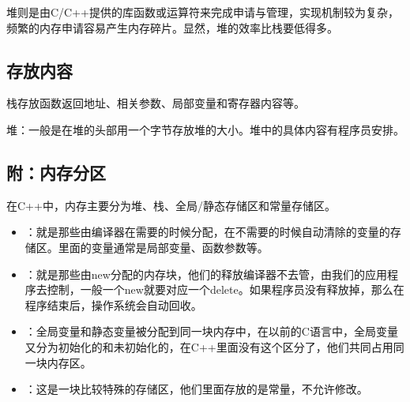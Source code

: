 \documentclass[letterpaper,10pt,english]{sphinxmanual}
\begin{document}
堆则是由C/C++提供的库函数或运算符来完成申请与管理，实现机制较为复杂，频繁的内存申请容易产生内存碎片。显然，堆的效率比栈要低得多。


\subsection{存放内容}
\label{\detokenize{cpp/11_heapStack:id7}}
栈存放函数返回地址、相关参数、局部变量和寄存器内容等。

堆：一般是在堆的头部用一个字节存放堆的大小。堆中的具体内容有程序员安排。


\subsection{附：内存分区}
\label{\detokenize{cpp/11_heapStack:id8}}
在C++中，内存主要分为堆、栈、全局/静态存储区和常量存储区。
\begin{itemize}
\item {} 
 ：就是那些由编译器在需要的时候分配，在不需要的时候自动清除的变量的存储区。里面的变量通常是局部变量、函数参数等。

\item {} 
 ：就是那些由new分配的内存块，他们的释放编译器不去管，由我们的应用程序去控制，一般一个new就要对应一个delete。如果程序员没有释放掉，那么在程序结束后，操作系统会自动回收。

\item {} 
 ：全局变量和静态变量被分配到同一块内存中，在以前的C语言中，全局变量又分为初始化的和未初始化的，在C++里面没有这个区分了，他们共同占用同一块内存区。

\item {} 
 ：这是一块比较特殊的存储区，他们里面存放的是常量，不允许修改。

\end{itemize}
\end{document}
